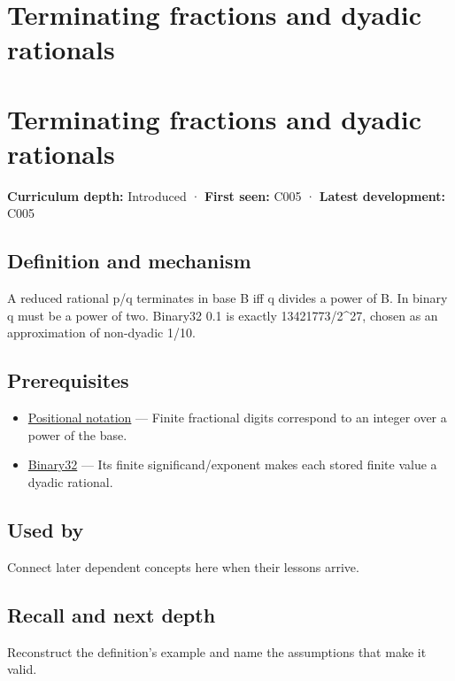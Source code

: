 \hypertarget{appendix-2a2f1b74bdd3}{}
\section*{Terminating fractions and dyadic rationals}
\section{Terminating fractions and dyadic rationals}\label{terminating-fractions-and-dyadic-rationals}

\textbf{Curriculum depth:} Introduced · \textbf{First seen:} C005 · \textbf{Latest development:} C005

\subsection{Definition and mechanism}\label{definition-and-mechanism}

A reduced rational p/q terminates in base B iff q divides a power of B. In binary q must be a power of two. Binary32 0.1 is exactly 13421773/2\^{}27, chosen as an approximation of non-dyadic 1/10.

\subsection{Prerequisites}\label{prerequisites}

\begin{itemize}
\tightlist
\item
  \hyperref[appendix-83c3f28f7bda]{Positional notation} --- Finite fractional digits correspond to an integer over a power of the base.
\item
  \hyperref[appendix-5057f9ad327f]{Binary32} --- Its finite significand/exponent makes each stored finite value a dyadic rational.
\end{itemize}

\subsection{Used by}\label{used-by}

Connect later dependent concepts here when their lessons arrive.

\subsection{Recall and next depth}\label{recall-and-next-depth}

Reconstruct the definition's example and name the assumptions that make it valid.

